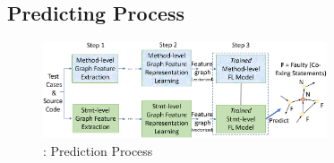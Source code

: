 












\subsection{Predicting Process}

\begin{figure}[t]
	\centering
	\includegraphics[width=3.3in]{graphs/overview-predict-3.png}
        \vspace{-10pt}
        \caption{{\tool}: Prediction Process}
	\label{predict-overview}
        \vspace{-1pt}
\end{figure}

